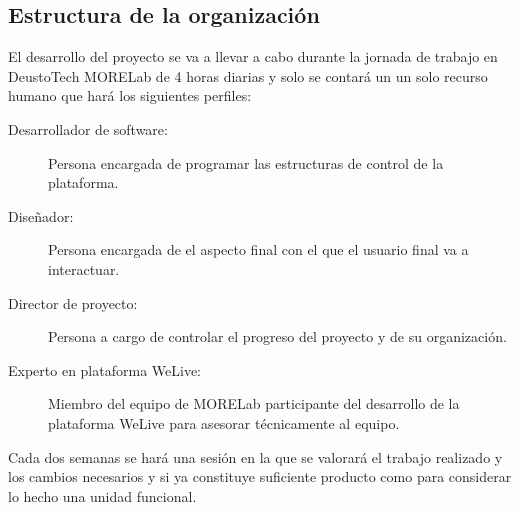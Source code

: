 \documentclass{DeustoFDP}
\begin{document}
\subsection{Estructura de la organización}
El desarrollo del proyecto se va a llevar a cabo durante la jornada de trabajo en DeustoTech MORELab de 4 horas diarias y solo se contará un un solo recurso humano que hará los siguientes perfiles:

\begin{description}
    \item[Desarrollador de software:] Persona encargada de programar las estructuras de control de la plataforma.
    \item[Diseñador:] Persona encargada de el aspecto final con el que el usuario final va a interactuar.
    \item[Director de proyecto:] Persona a cargo de controlar el progreso del proyecto y de su organización.
    \item[Experto en plataforma WeLive:] Miembro del equipo de MORELab participante del desarrollo de la plataforma WeLive para asesorar técnicamente al equipo.
\end{description}

Cada dos semanas se hará una sesión en la que se valorará el trabajo realizado y los cambios necesarios y si ya constituye suficiente producto como para considerar lo hecho una unidad funcional.
\end{document}
